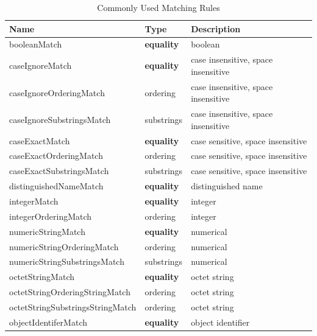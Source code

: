 \documentclass[a4paper]{report}
\begin{document}
\begin{table}[H]
	\centering
	\caption{Commonly Used Matching Rules}
	\begin{tabular}{|l|l|l|}
		\hline
		\textbf{Name}                    & \textbf{Type}     & \textbf{Description}                \\ \hline
		booleanMatch                     & \textbf{equality} & boolean                             \\ \hline
		caseIgnoreMatch                  & \textbf{equality} & case insensitive, space insensitive \\ \hline
		caseIgnoreOrderingMatch          & ordering          & case insensitive, space insensitive \\ \hline
		caseIgnoreSubstringsMatch        & substrings        & case insensitive, space insensitive \\ \hline
		caseExactMatch                   & \textbf{equality} & case sensitive, space insensitive   \\ \hline
		caseExactOrderingMatch           & ordering          & case sensitive, space insensitive   \\ \hline
		caseExactSubstringsMatch         & substrings        & case sensitive, space insensitive   \\ \hline
		distinguishedNameMatch           & \textbf{equality} & distinguished name                  \\ \hline
		integerMatch                     & \textbf{equality} & integer                             \\ \hline
		integerOrderingMatch             & ordering          & integer                             \\ \hline
		numericStringMatch               & \textbf{equality} & numerical                           \\ \hline
		numericStringOrderingMatch       & ordering          & numerical                           \\ \hline
		numericStringSubstringsMatch     & substrings        & numerical                           \\ \hline
		octetStringMatch                 & \textbf{equality} & octet string                        \\ \hline
		octetStringOrderingStringMatch   & ordering          & octet string                        \\ \hline
		octetStringSubstringsStringMatch & ordering          & octet string                        \\ \hline
		objectIdentiferMatch             & \textbf{equality} & object identifier                   \\ \hline
	\end{tabular}
\end{table}
\end{document}

